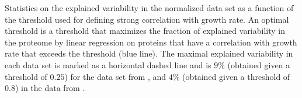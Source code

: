 \label{fig:threshold}
  Statistics on the explained variability in the normalized data set as a function of the threshold used for defining strong correlation with growth rate.
  An optimal threshold is a threshold that maximizes the fraction of explained variability in the proteome by linear regression on proteins that have a correlation with growth rate that exceeds the threshold (blue line).
  The maximal explained variability in each data set is marked as a horizontal dashed line and is $9\%$ (obtained given a threshold of $0.25$) for the data set from \cite{Heinemann2015}, and $4\%$ (obtained given a threshold of $0.8$) in the data from \cite{Valgepea2013}.
